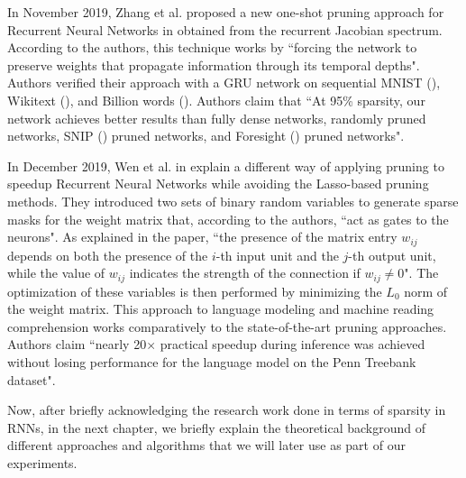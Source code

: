 In November 2019, Zhang et al. proposed a new one-shot pruning approach for Recurrent Neural Networks in \cite{zhang} obtained from the recurrent Jacobian spectrum. According to the authors, this technique works by ``forcing the network to preserve weights that propagate information through its temporal depths". Authors verified their approach with a GRU network on sequential MNIST (\cite{mnist}), Wikitext (\cite{wikitext}), and Billion words (\cite{billion_words}). Authors claim that ``At 95\% sparsity, our network achieves better results than fully dense networks, randomly pruned networks, SNIP (\cite{one_shot}) pruned networks, and Foresight (\cite{foresight}) pruned networks".

In December 2019, Wen et al. in \cite{wen} explain a different way of applying pruning to speedup Recurrent Neural Networks while avoiding the Lasso-based pruning methods. They introduced two sets of binary random variables to generate sparse masks for the weight matrix that, according to the authors, ``act as gates to the neurons". As explained in the paper, ``the presence of the matrix entry $w_{ij}$ depends on both the presence of the $i$-th input unit and the $j$-th output unit, while the value of $w_{ij}$ indicates the strength of the connection if $w_{ij} \neq 0$". The optimization of these variables is then performed by minimizing the $L_0$ norm of the weight matrix. This approach to language modeling and machine reading comprehension works comparatively to the state-of-the-art pruning approaches. Authors claim ``nearly 20$\times$ practical speedup during inference was achieved without losing performance for the language model on the Penn Treebank dataset". 

Now, after briefly acknowledging the research work done in terms of sparsity in RNNs, in the next chapter, we briefly explain the theoretical background of different approaches and algorithms that we will later use as part of our experiments.